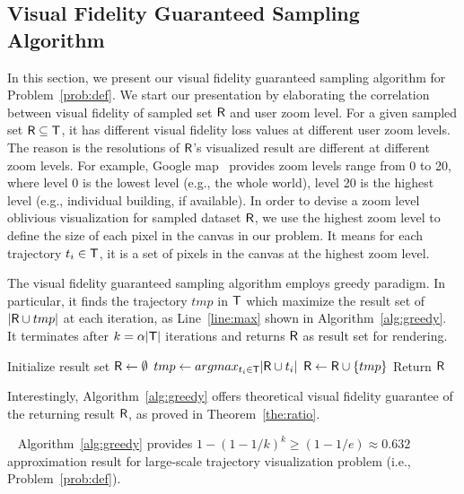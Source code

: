 \subsection{Visual Fidelity Guaranteed Sampling Algorithm}\label{sec:greedy}
In this section, we present our visual fidelity guaranteed sampling algorithm for Problem~\ref{prob:def}.
We start our presentation by elaborating the correlation between visual fidelity of sampled set $\mathsf{R}$ and user zoom level.
For a given sampled set $\mathsf{R} \subseteq \mathsf{T}$, it has different visual fidelity loss values at different user zoom levels.
The reason is the resolutions of $\mathsf{R}$'s visualized result are different at different zoom levels.
For example, Google map~\cite{googlemap} provides zoom levels range from 0 to 20,
where level 0 is the lowest level (e.g., the whole world), level 20 is the highest level (e.g., individual building, if available).
In order to devise a zoom level oblivious visualization for sampled dataset $\mathsf{R}$,
we use the highest zoom level to define the size of each pixel in the canvas in our problem.
It means for each trajectory $t_i \in \mathsf{T}$, it is a set of pixels in the canvas at the highest zoom level.

The visual fidelity guaranteed sampling algorithm employs greedy paradigm.
In particular, it finds the trajectory $tmp$ in $\mathsf{T}$ which maximize the result set of $|\mathsf{R} \cup tmp|$ at each iteration, as Line~\ref{line:max} shown in Algorithm~\ref{alg:greedy}.
It terminates after $k=\alpha |\mathsf{T}|$ iterations and returns $\mathsf{R}$ as result set for rendering.

\begin{algorithm}
    \caption{$\vats(\D,k=\alpha |\D|)$} \label{alg:greedy}
    \begin{algorithmic}[1]
    \State Initialize result set $\mathsf{R} \leftarrow \emptyset$
        \State $tmp \leftarrow argmax_{t_i \in \mathsf{T}} |\mathsf{R} \cup t_i|$ \label{line:max}
        \State $\mathsf{R} \leftarrow \mathsf{R} \cup \{ tmp \}$
    \EndWhile
    \State Return $\mathsf{R}$
    \end{algorithmic}
\end{algorithm}

Interestingly, Algorithm~\ref{alg:greedy} offers theoretical visual fidelity guarantee of the returning result $\mathsf{R}$, as proved in Theorem~\ref{the:ratio}.

\begin{theorem}~\label{the:ratio}
Algorithm~\ref{alg:greedy} provides $1-(1-1/k)^k \geq (1-1/e) \approx 0.632$ approximation result for large-scale trajectory visualization problem (i.e., Problem~\ref{prob:def}).
\end{theorem}

